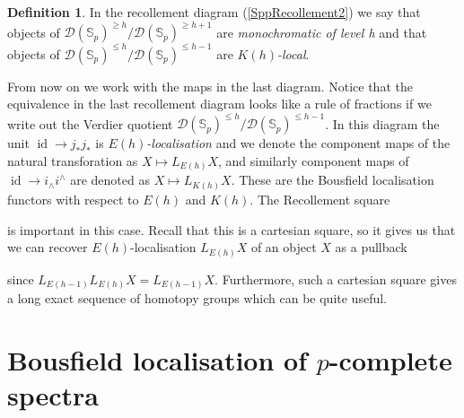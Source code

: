 \documentclass[a4paper]{article} %
\theoremstyle{definition}
\newtheorem{definition}[theorem]{Definition}
\newcommand{\Spp}{\mathcal{D}(\mathbb{S}_p)}
\begin{document}
\begin{definition}
In the recollement diagram (\ref{SppRecollement2}) we say that objects of $\Spp^{\ge h}/\Spp^{\ge h+1}$ are \textit{monochromatic of level h} and that objects of $\Spp^{\le h}/\Spp^{\le h-1}$ are $K(h)$\textit{-local}.
\end{definition}
From now on we work with the maps in the last diagram. Notice that the equivalence in the last recollement diagram looks like a rule of fractions if we write out the Verdier quotient $\Spp^{\le h} / \Spp^{\le h -1}$. In this diagram the unit $\operatorname{id} \to j_*j_*$ is $E(h)$\textit{-localisation} and we denote the component maps of the natural transforation as $X \mapsto L_{E(h)}X$, and similarly component maps of $\operatorname{id} \to i_\wedge i^\wedge$ are denoted as $X \mapsto L_{K(h)}X$. These are the Bousfield localisation functors with respect to $E(h)$ and $K(h)$. The Recollement square
\begin{center}
\end{center}
is important in this case. Recall that this is a cartesian square, so it gives us that we can recover $E(h)$-localisation $L_{E(h)}X$ of an object $X$ as a pullback
\begin{center}
\end{center}
since $L_{E(h-1)}L_{E(h)}X = L_{E(h-1)}X$. Furthermore, such a cartesian square gives a long exact sequence of homotopy groups which can be quite useful.

\section{Bousfield localisation of $p$-complete spectra}
\end{document}

